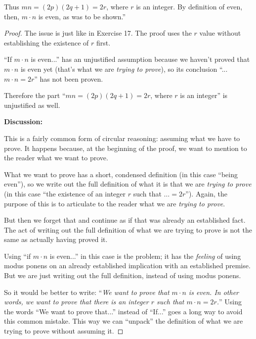 \documentclass[14pt]{extarticle}
\begin{document}
Thus $mn = (2p)(2q + 1) = 2r$, where $r$ is an integer. By definition of even, then, $m\cdot n$ is even, as was to be shown.”

\begin{proof}
    The issue is just like in Exercise 17. The proof uses the $r$ value without establishing the existence of $r$ first.

    ``If $m \cdot n$ is even...'' has an unjustified assumption because we haven't proved that $m \cdot n$ is even yet (that's what we are {\it trying to prove}), so its conclusion ``...$m\cdot n = 2r$'' has not been proven.

    Therefore the part ``$mn = (2p)(2q + 1) = 2r$, where $r$ is an integer'' is unjustified as well.

        {\bf Discussion:}

    This is a fairly common form of circular reasoning: assuming what we have to prove. It happens because, at the beginning of the proof, we want to mention to the reader what we want to prove.

    What we want to prove has a short, condensed definition (in this case ``being even''), so we write out the full definition of what it is that we are {\it trying to prove} (in this case ``the existence of an integer $r$ such that $\ldots = 2r$''). Again, the purpose of this is to articulate to the reader what we are {\it trying to prove}.

    But then we forget that and continue as if that was already an established fact. The act of writing out the full definition of what we are trying to prove is not the same as actually having proved it.

    Using ``if $m\cdot n$ is even...'' in this case is the problem; it has the {\it feeling} of using modus ponens on an already established implication with an established premise. But we are just writing out the full definition, instead of using modus ponens.

    So it would be better to write: ``{\it We want to prove that $m\cdot n$ is even. In other words, we want to prove that there is an integer $r$ such that $m \cdot n = 2r$.}'' Using the words ``We want to prove that...'' instead of ``If...'' goes a long way to avoid this common mistake. This way we can ``unpack'' the definition of what we are trying to prove without assuming it.


\end{proof}
\end{document}
